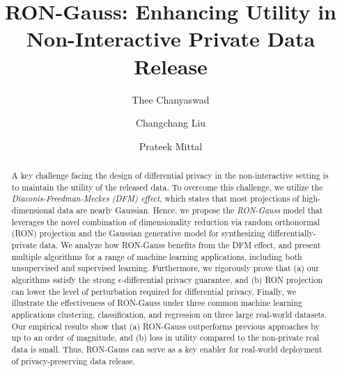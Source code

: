 \documentclass[USenglish,oneside,twocolumn]{article}
\theoremstyle{definition}
\theoremstyle{remark}
\theoremstyle{plain}
\theoremstyle{plain}
\begin{document}
 

  \author*[1]{Thee Chanyaswad}

  \author[2]{Changchang Liu}

  \author[3]{Prateek Mittal}






  \title{\huge RON-Gauss: Enhancing Utility in Non-Interactive
Private Data Release}



  \begin{abstract}
{
A key challenge facing the design of differential privacy in the non-interactive
setting is to maintain the utility of the released data. To overcome
this challenge, we utilize the \emph{Diaconis-Freedman-Meckes (DFM)
effect}, which states that most projections of high-dimensional data
are nearly Gaussian. Hence, we propose the \emph{RON-Gauss} model
that leverages the novel combination of dimensionality reduction via
random orthonormal (RON) projection and the Gaussian generative model
for synthesizing differentially-private data. We analyze how RON-Gauss
benefits from the DFM effect, and present multiple algorithms for
a range of machine learning applications, including both unsupervised
and supervised learning. Furthermore, we rigorously prove that (a)
our algorithms satisfy the strong $\epsilon$-differential privacy
guarantee, and (b) RON projection can lower the level of perturbation
required for differential privacy. Finally, we illustrate the effectiveness
of RON-Gauss under three common machine learning applications \textendash{}
clustering, classification, and regression \textendash{} on three
large real-world datasets. Our empirical results show that (a) RON-Gauss
outperforms previous approaches by up to an order of magnitude, and (b)
loss in utility compared to the non-private real data is small. Thus,
RON-Gauss can serve as a key enabler for real-world deployment of
privacy-preserving data release.
}
\end{abstract}
\end{document}
